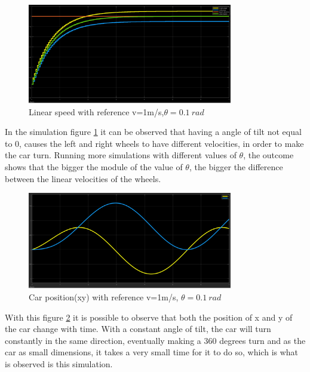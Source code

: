 \begin{figure}[!h]
\centering
\includegraphics[width=0.8\textwidth]{./img/vel101.png}
\caption {\label{fig:sim2 - vel}Linear speed with reference v=1m/s,$\theta = 0.1~\si{rad}$}
\end{figure}
In the simulation figure \ref{fig:sim2 - vel} it can be observed that having a angle of tilt not equal to 0, causes the left and right wheels to have different velocities, in order to make the car turn. Running more simulations with different values of $\theta$, the outcome shows that the bigger the module of the value of $\theta$, the bigger the difference between the linear velocities of the wheels.\


\begin{figure}[!ht]
\centering
\includegraphics[width=0.8\textwidth]{./img/xy101.png}
\caption {\label{fig:sim2 - pos}Car position(xy) with reference v=1m/s, $\theta = 0.1~\si{rad}$}
\end{figure}
With this figure \ref{fig:sim2 - pos} it is possible to observe that both the
position of x and y of the car change with time. With a constant angle of tilt,
the car will turn constantly in the same direction, eventually making a 360
degrees turn and as the car as small dimensions, it takes a very small time for
it to do so, which is what is observed is this simulation.
